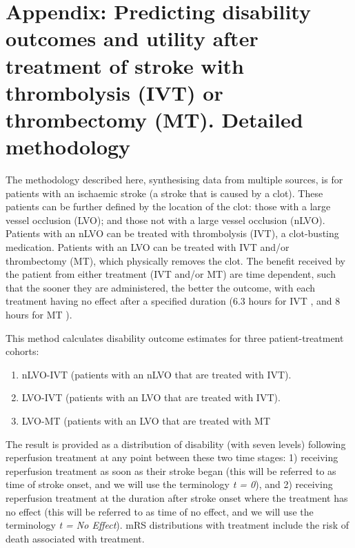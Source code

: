 \section*{Appendix: Predicting disability outcomes and utility after treatment of stroke with thrombolysis (IVT) or thrombectomy (MT). Detailed methodology}

\appendix
\setcounter{section}{0}
\renewcommand{\thesection}{A\Alph{section}}
\setcounter{figure}{0}
\renewcommand{\thefigure}{A.\arabic{figure}}
\setcounter{table}{0}
\renewcommand{\thetable}{A.\arabic{table}}

The methodology described here, synthesising data from multiple sources, is for patients with an ischaemic stroke (a stroke that is caused by a clot). These patients can be further defined by the location of the clot: those with a large vessel occlusion (LVO); and those not with a large vessel occlusion (nLVO). Patients with an nLVO can be treated with thrombolysis (IVT), a clot-busting medication. Patients with an LVO can be treated with IVT and/or thrombectomy (MT), which physically removes the clot. The benefit received by the patient from either treatment (IVT and/or MT) are time dependent, such that the sooner they are administered, the better the outcome, with each treatment having no effect after a specified duration (6.3 hours for IVT \cite{emberson_effect_2014}, and 8 hours for MT \cite{fransen_time_2016}). 

This method calculates disability outcome estimates for three patient-treatment cohorts: 

\begin{enumerate}
    \item nLVO-IVT (patients with an nLVO that are treated with IVT).
    \item LVO-IVT (patients with an LVO that are treated with IVT).
    \item LVO-MT (patients with an LVO that are treated with MT
    
\end{enumerate}

The result is provided as a distribution of disability (with seven levels) following reperfusion treatment at any point between these two time stages: 1) receiving reperfusion treatment as soon as their stroke began (this will be referred to as time of stroke onset, and we will use the terminology \textit{t = 0}), and 2) receiving reperfusion treatment at the duration after stroke onset where the treatment has no effect (this will be referred to as time of no effect, and we will use the terminology \textit{t = No Effect}). mRS distributions with treatment include the risk of death associated with treatment.

